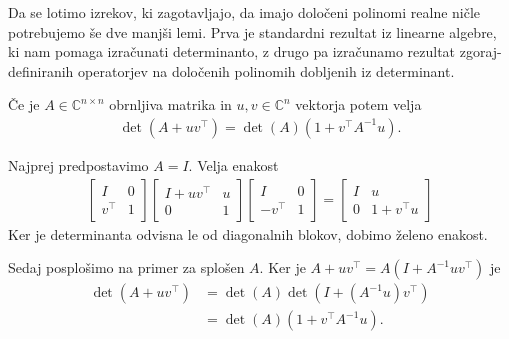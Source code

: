 Da se lotimo izrekov, ki zagotavljajo, da imajo določeni polinomi realne ničle potrebujemo še dve manjši lemi. Prva je standardni rezultat iz linearne algebre, ki nam pomaga izračunati determinanto\cite{matrix-determinant-lemma}, z drugo pa izračunamo rezultat zgoraj-definiranih operatorjev na določenih polinomih dobljenih iz determinant.
\begin{lema}\label{matrix-det-lemma}
    Če je \(A\in \mathbb C^{n\times n}\) obrnljiva matrika in \(u, v \in \mathbb C^n\) vektorja potem velja
    \begin{align*}
        \det(A + uv^\top) = \det(A) (1 + v^\top A^{-1} u).
    \end{align*}
\end{lema}
\begin{dokaz}
    Najprej predpostavimo \(A=I\). Velja enakost
    \begin{align*}
        \begin{bmatrix}
            I      & 0 \\
            v^\top & 1
        \end{bmatrix}
        \begin{bmatrix}
            I + uv^\top & u \\
            0           & 1
        \end{bmatrix}
        \begin{bmatrix}
            I       & 0 \\
            -v^\top & 1
        \end{bmatrix}
        =
        \begin{bmatrix}
            I & u            \\
            0 & 1 + v^\top u
        \end{bmatrix}
    \end{align*}
    Ker je determinanta odvisna le od diagonalnih blokov, dobimo želeno enakost.

    Sedaj posplošimo na primer za splošen \(A\). Ker je \(A+uv^\top= A(I + A^{-1}uv^\top)\) je
    \begin{align*}
        \det(A + uv^\top) & = \det(A) \det(I + (A^{-1}u)v^\top) \\
                          & = \det(A) (1 + v^\top A^{-1} u).
    \end{align*}
\end{dokaz}

